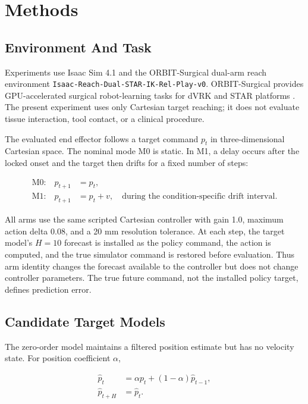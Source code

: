 \documentclass[10pt]{article}
\begin{document}
\section{Methods}

\subsection{Environment And Task}

Experiments use Isaac Sim 4.1 and the ORBIT-Surgical dual-arm reach environment \nolinkurl{Isaac-Reach-Dual-STAR-IK-Rel-Play-v0}. ORBIT-Surgical provides GPU-accelerated surgical robot-learning tasks for dVRK and STAR platforms \cite{yu2024orbit}. The present experiment uses only Cartesian target reaching; it does not evaluate tissue interaction, tool contact, or a clinical procedure.

The evaluated end effector follows a target command \(p_t\) in three-dimensional Cartesian space. The nominal mode M0 is static. In M1, a delay occurs after the locked onset and the target then drifts for a fixed number of steps:

\begin{align*}
\text{M0:}\quad p_{t+1} &= p_t, \\
\text{M1:}\quad p_{t+1} &= p_t + v,
\quad \text{during the condition-specific drift interval}.
\end{align*}

All arms use the same scripted Cartesian controller with gain 1.0, maximum action delta 0.08, and a 20 mm resolution tolerance. At each step, the target model's \(H=10\) forecast is installed as the policy command, the action is computed, and the true simulator command is restored before evaluation. Thus arm identity changes the forecast available to the controller but does not change controller parameters. The true future command, not the installed policy target, defines prediction error.

\subsection{Candidate Target Models}

The zero-order model maintains a filtered position estimate but has no velocity state. For position coefficient \(\alpha\),

\begin{align*}
\hat p_t &= \alpha p_t + (1-\alpha)\hat p_{t-1}, \\
\hat p_{t+H} &= \hat p_t.
\end{align*}
\end{document}

